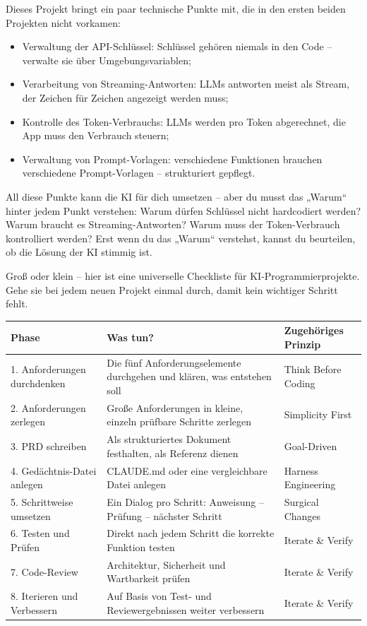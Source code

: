 Dieses Projekt bringt ein paar technische Punkte mit, die in den ersten beiden Projekten nicht vorkamen:

\begin{itemize}
  \item Verwaltung der API-Schlüssel: Schlüssel gehören niemals in den Code – verwalte sie über Umgebungsvariablen;
  \item Verarbeitung von Streaming-Antworten: LLMs antworten meist als Stream, der Zeichen für Zeichen angezeigt werden muss;
  \item Kontrolle des Token-Verbrauchs: LLMs werden pro Token abgerechnet, die App muss den Verbrauch steuern;
  \item Verwaltung von Prompt-Vorlagen: verschiedene Funktionen brauchen verschiedene Prompt-Vorlagen – strukturiert gepflegt.
\end{itemize}

All diese Punkte kann die KI für dich umsetzen – aber du musst das „Warum“ hinter jedem Punkt verstehen: Warum dürfen Schlüssel nicht hardcodiert werden? Warum braucht es Streaming-Antworten? Warum muss der Token-Verbrauch kontrolliert werden? Erst wenn du das „Warum“ verstehst, kannst du beurteilen, ob die Lösung der KI stimmig ist.


Groß oder klein – hier ist eine universelle Checkliste für KI-Programmierprojekte. Gehe sie bei jedem neuen Projekt einmal durch, damit kein wichtiger Schritt fehlt.

\begin{center}
\begin{tabularx}{\linewidth}{|X|X|X|}
\hline
\textbf{Phase} & \textbf{Was tun?} & \textbf{Zugehöriges Prinzip} \tabularnewline
\hline
1. Anforderungen durchdenken & Die fünf Anforderungselemente durchgehen und klären, was entstehen soll & Think Before Coding \tabularnewline
2. Anforderungen zerlegen & Große Anforderungen in kleine, einzeln prüfbare Schritte zerlegen & Simplicity First \tabularnewline
3. PRD schreiben & Als strukturiertes Dokument festhalten, als Referenz dienen & Goal-Driven \tabularnewline
4. Gedächtnis-Datei anlegen & CLAUDE.md oder eine vergleichbare Datei anlegen & Harness Engineering \tabularnewline
5. Schrittweise umsetzen & Ein Dialog pro Schritt: Anweisung – Prüfung – nächster Schritt & Surgical Changes \tabularnewline
6. Testen und Prüfen & Direkt nach jedem Schritt die korrekte Funktion testen & Iterate \& Verify \tabularnewline
7. Code-Review & Architektur, Sicherheit und Wartbarkeit prüfen & Iterate \& Verify \tabularnewline
8. Iterieren und Verbessern & Auf Basis von Test- und Reviewergebnissen weiter verbessern & Iterate \& Verify \tabularnewline
\hline
\end{tabularx}
\end{center}

